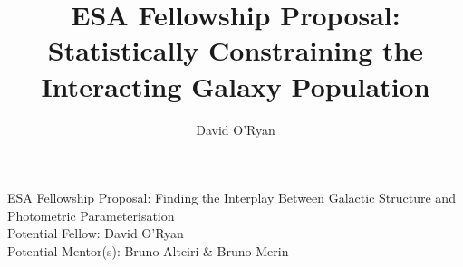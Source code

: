 \documentclass[11pt,usenatbib]{article}
\title{ESA Fellowship Proposal: Statistically Constraining the Interacting Galaxy Population}
\author{David O'Ryan}
\begin{document}
    \begin{center}
        \large{{ESA Fellowship Proposal: Finding the Interplay Between Galactic Structure and Photometric Parameterisation \\
        Potential Fellow: David O'Ryan \\
        Potential Mentor(s): Bruno Alteiri \& Bruno Merin}}
    \end{center}
    
\end{document}

